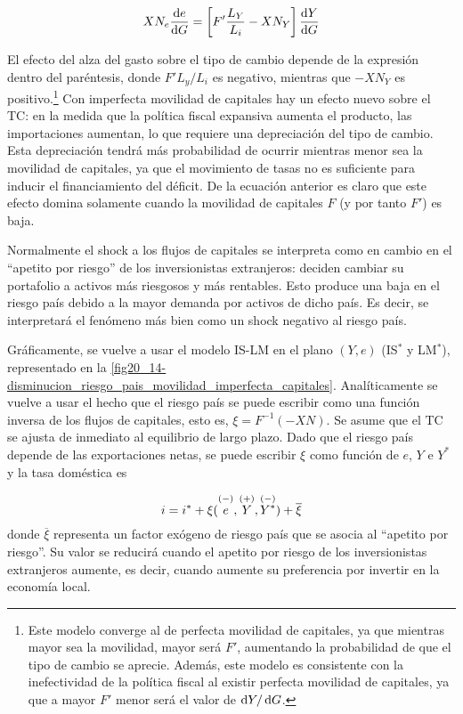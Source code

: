 \documentclass[DeGregorioResumen]{subfiles}
\begin{document}
\begin{equation*}
	XN_e \frac{\mathrm{d}e}{\mathrm{d}G} = \left [ F' \frac{L_Y}{L_i} - XN_Y \right] \frac{\mathrm{d}Y}{\mathrm{d}G}
\end{equation*}

El efecto del alza del gasto sobre el tipo de cambio depende de la expresión dentro del paréntesis, donde $F' L_y/L_i$ es negativo, mientras que $-XN_Y$ es positivo.\footnote{Este modelo converge al de perfecta movilidad de capitales, ya que mientras mayor sea la movilidad, mayor será $F'$, aumentando la probabilidad de que el tipo de cambio se aprecie. Además, este modelo es consistente con la inefectividad de la política fiscal al existir perfecta movilidad de capitales, ya que a mayor $F'$ menor será el valor de $\mathop{}\!\mathrm{d} Y / \mathop{}\!\mathrm{d} G$.} Con imperfecta movilidad de capitales hay un efecto nuevo sobre el TC: en la medida que la política fiscal expansiva aumenta el producto, las importaciones aumentan, lo que requiere una depreciación del tipo de cambio. Esta depreciación tendrá más probabilidad de ocurrir mientras menor sea la movilidad de capitales, ya que el movimiento de tasas no es suficiente para inducir el financiamiento del déficit. De la ecuación anterior es claro que este efecto domina solamente cuando la movilidad de capitales $F$ (y por tanto $F'$) es baja.


Normalmente el shock a los flujos de capitales se interpreta como en cambio en el ``apetito por riesgo'' de los inversionistas extranjeros: deciden cambiar su portafolio a activos más riesgosos y más rentables. Esto produce una baja en el riesgo país debido a la mayor demanda por activos de dicho país. Es decir, se interpretará el fenómeno más bien como un shock negativo al riesgo país.

Gráficamente, se vuelve a usar el modelo IS-LM en el plano $(Y, e)$ (IS$^*$ y LM$^*$), representado en la \autoref{fig20_14-disminucion_riesgo_pais_movilidad_imperfecta_capitales}. Analíticamente se vuelve a usar el hecho que el riesgo país se puede escribir como una función inversa de los flujos de capitales, esto es, $\xi=F^{-1}(-XN)$. Se asume que el TC se ajusta de inmediato al equilibrio de largo plazo. Dado que el riesgo país depende de las exportaciones netas, se puede escribir $\xi$ como función de $e$, $Y$ e $Y^*$ y la tasa doméstica es

\begin{equation}
	i = i^* + \xi(\overset{(-)}{\mathstrut e}, \overset{(+)}{\mathstrut Y}, \overset{(-)}{\mathstrut Y^*}) + \overline\xi
\end{equation}
donde $\overline\xi$ representa un factor exógeno de riesgo país que se asocia al ``apetito por riesgo''. Su valor se reducirá cuando el apetito por riesgo de los inversionistas extranjeros aumente, es decir, cuando aumente su preferencia por invertir en la economía local.
\end{document}
